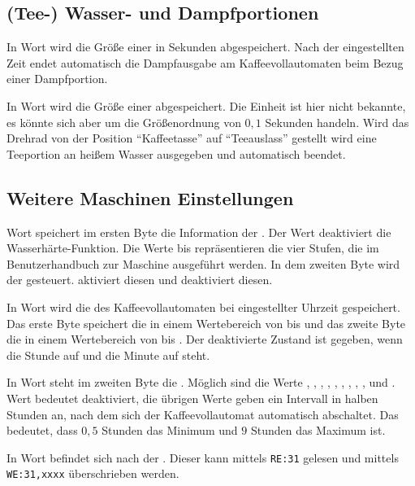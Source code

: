 \subsection{(Tee-) Wasser- und Dampfportionen}
In Wort  wird die Größe einer  in Sekunden abgespeichert.
Nach der eingestellten Zeit endet automatisch die Dampfausgabe am Kaffeevollautomaten beim Bezug einer Dampfportion.

In Wort  wird die Größe einer  abgespeichert.
Die Einheit ist hier nicht bekannte, es könnte sich aber um die Größenordnung von $0,1$ Sekunden handeln.
Wird das Drehrad von der Position "`Kaffeetasse"' auf "`Teeauslass"' gestellt wird eine Teeportion an heißem Wasser ausgegeben und automatisch beendet.

\subsection{Weitere Maschinen Einstellungen}
Wort  speichert im ersten Byte die Information der .
Der Wert  deaktiviert die Wasserhärte-Funktion.
Die Werte  bis  repräsentieren die vier Stufen, die im Benutzerhandbuch zur Maschine ausgeführt werden.
In dem zweiten Byte wird der  gesteuert.
 aktiviert diesen und  deaktiviert diesen.

In Wort  wird die  des Kaffeevollautomaten bei eingestellter Uhrzeit gespeichert.
Das erste Byte speichert die  in einem Wertebereich von  bis  und das zweite Byte die  in einem Wertebereich von  bis .
Der deaktivierte Zustand ist gegeben, wenn die Stunde auf  und die Minute auf  steht.

In Wort  steht im zweiten Byte die .
Möglich sind die Werte , , , , , , , , ,  und .
Wert  bedeutet deaktiviert, die übrigen Werte geben ein Intervall in halben Stunden an, nach dem sich der Kaffeevollautomat automatisch abschaltet.
Das bedeutet, dass $0,5$ Stunden das Minimum und $9$ Stunden das Maximum ist.

In Wort  befindet sich nach \cite{GitCoffeeMachine} der .
Dieser kann mittels \texttt{RE:31} gelesen und mittels \texttt{WE:31,xxxx} überschrieben werden.

